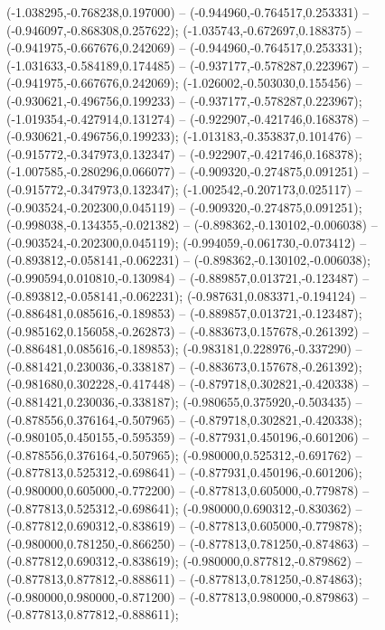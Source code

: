  (-1.038295,-0.768238,0.197000) -- (-0.944960,-0.764517,0.253331) -- (-0.946097,-0.868308,0.257622);
 (-1.035743,-0.672697,0.188375) -- (-0.941975,-0.667676,0.242069) -- (-0.944960,-0.764517,0.253331);
 (-1.031633,-0.584189,0.174485) -- (-0.937177,-0.578287,0.223967) -- (-0.941975,-0.667676,0.242069);
 (-1.026002,-0.503030,0.155456) -- (-0.930621,-0.496756,0.199233) -- (-0.937177,-0.578287,0.223967);
 (-1.019354,-0.427914,0.131274) -- (-0.922907,-0.421746,0.168378) -- (-0.930621,-0.496756,0.199233);
 (-1.013183,-0.353837,0.101476) -- (-0.915772,-0.347973,0.132347) -- (-0.922907,-0.421746,0.168378);
 (-1.007585,-0.280296,0.066077) -- (-0.909320,-0.274875,0.091251) -- (-0.915772,-0.347973,0.132347);
 (-1.002542,-0.207173,0.025117) -- (-0.903524,-0.202300,0.045119) -- (-0.909320,-0.274875,0.091251);
 (-0.998038,-0.134355,-0.021382) -- (-0.898362,-0.130102,-0.006038) -- (-0.903524,-0.202300,0.045119);
 (-0.994059,-0.061730,-0.073412) -- (-0.893812,-0.058141,-0.062231) -- (-0.898362,-0.130102,-0.006038);
 (-0.990594,0.010810,-0.130984) -- (-0.889857,0.013721,-0.123487) -- (-0.893812,-0.058141,-0.062231);
 (-0.987631,0.083371,-0.194124) -- (-0.886481,0.085616,-0.189853) -- (-0.889857,0.013721,-0.123487);
 (-0.985162,0.156058,-0.262873) -- (-0.883673,0.157678,-0.261392) -- (-0.886481,0.085616,-0.189853);
 (-0.983181,0.228976,-0.337290) -- (-0.881421,0.230036,-0.338187) -- (-0.883673,0.157678,-0.261392);
 (-0.981680,0.302228,-0.417448) -- (-0.879718,0.302821,-0.420338) -- (-0.881421,0.230036,-0.338187);
 (-0.980655,0.375920,-0.503435) -- (-0.878556,0.376164,-0.507965) -- (-0.879718,0.302821,-0.420338);
 (-0.980105,0.450155,-0.595359) -- (-0.877931,0.450196,-0.601206) -- (-0.878556,0.376164,-0.507965);
 (-0.980000,0.525312,-0.691762) -- (-0.877813,0.525312,-0.698641) -- (-0.877931,0.450196,-0.601206);
 (-0.980000,0.605000,-0.772200) -- (-0.877813,0.605000,-0.779878) -- (-0.877813,0.525312,-0.698641);
 (-0.980000,0.690312,-0.830362) -- (-0.877812,0.690312,-0.838619) -- (-0.877813,0.605000,-0.779878);
 (-0.980000,0.781250,-0.866250) -- (-0.877813,0.781250,-0.874863) -- (-0.877812,0.690312,-0.838619);
 (-0.980000,0.877812,-0.879862) -- (-0.877813,0.877812,-0.888611) -- (-0.877813,0.781250,-0.874863);
 (-0.980000,0.980000,-0.871200) -- (-0.877813,0.980000,-0.879863) -- (-0.877813,0.877812,-0.888611);
